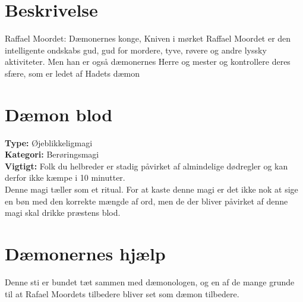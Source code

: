 \section{Beskrivelse}
Raffael Moordet: Dæmonernes konge, Kniven i mørket Raffael Moordet er den intelligente ondskabs
gud, gud for mordere, tyve, røvere og andre lyssky aktiviteter. Men han er også dæmonernes Herre og
mester og kontrollere deres sfære, som er ledet af Hadets dæmon

\section{Dæmon blod}
\textbf{Type:} Øjeblikkeligmagi\\
\textbf{Kategori:} Berøringsmagi\\
\textbf{Vigtigt:} Folk du helbreder er stadig påvirket af almindelige dødregler og kan derfor ikke kæmpe i 10 minutter.\\
Denne magi tæller som et ritual. For at kaste denne magi er det ikke nok at sige en bøn med den korrekte mængde af ord, men de der bliver påvirket af denne magi skal drikke præstens blod.

\section{Dæmonernes hjælp}
Denne sti er bundet tæt sammen med dæmonologen, og en af de mange grunde til at Rafael Moordets tilbedere bliver set som dæmon tilbedere.\\
